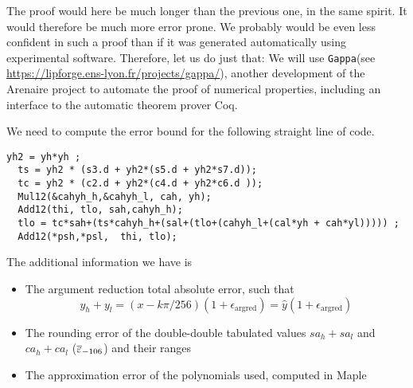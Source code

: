 The proof would here be much longer than the previous one, in the same
spirit. It would therefore be much more error prone. We probably would
be even less confident in such a proof than if it was generated
automatically using experimental software. Therefore, let us do just
that: We will use \texttt{Gappa}(see
\url{https://lipforge.ens-lyon.fr/projects/gappa/}), another
development of the Arenaire project to automate the proof of numerical
properties, including an interface to the automatic theorem prover Coq.

We need to compute the error bound for the following straight line of
code.

\begin{lstlisting}[caption={DoSinNotZero},firstnumber=1]
  yh2 = yh*yh ;
  ts = yh2 * (s3.d + yh2*(s5.d + yh2*s7.d));	
  tc = yh2 * (c2.d + yh2*(c4.d + yh2*c6.d ));	
  Mul12(&cahyh_h,&cahyh_l, cah, yh);				       
  Add12(thi, tlo, sah,cahyh_h);					       
  tlo = tc*sah+(ts*cahyh_h+(sal+(tlo+(cahyh_l+(cal*yh + cah*yl))))) ;  
  Add12(*psh,*psl,  thi, tlo);	   			               
\end{lstlisting}

The additional information we have is 

\begin{itemize}

\item The argument reduction total absolute error, such that 
  \begin{equation}
    y_h+y_l = (x-k\pi/256)(1+\epsilon_{\mathrm{argred}}) 
    = \hat{y}(1+\epsilon_{\mathrm{argred}})
  \end{equation}

\item The rounding error of the double-double tabulated values
  $sa_h+sa_l$ and  $ca_h+ca_l$  (${\overline{\varepsilon}}_{-106}$) and their ranges

\item The approximation error of the polynomials used, computed in
  Maple
\end{itemize}

